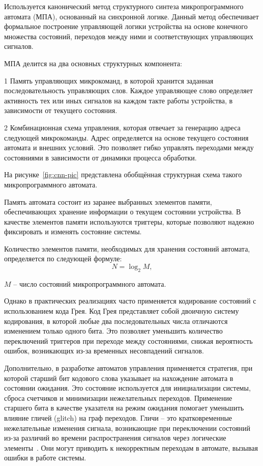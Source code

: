 Используется канонический метод структурного синтеза микропрограммного автомата 
(МПА), основанный на синхронной логике. Данный метод обеспечивает формальное 
построение управляющей логики устройства на основе конечного множества 
состояний, переходов между ними и соответствующих управляющих сигналов.

МПА делится на два основных структурных компонента:

1 Память управляющих микрокоманд, в которой хранится заданная последовательность 
управляющих слов. Каждое управляющее слово определяет активность тех или иных 
сигналов на каждом такте работы устройства, в зависимости от текущего 
состояния.

2 Комбинационная схема управления, которая отвечает за генерацию адреса 
следующей микрокоманды. Адрес определяется на основе текущего состояния 
автомата и внешних условий. Это позволяет гибко управлять переходами между 
состояниями в зависимости от динамики процесса обработки.

На рисунке~\ref{fig:cnn-pic} представлена обобщённая структурная схема 
такого микропрограммного автомата. 


Память автомата состоит из заранее выбранных элементов памяти, обеспечивающих 
хранение информации о текущем состоянии устройства. В качестве элементов памяти 
используются триггеры, которые позволяют надежно фиксировать и изменять 
состояние системы.  

Количество элементов памяти, необходимых для хранения состояний автомата, 
определяется по следующей формуле:
\begin{equation}
    N = \log_{2}{M},
\end{equation}

 $M$ – число состояний микропрограммного автомата.  

Однако в практических реализациях часто применяется кодирование состояний с 
использованием кода Грея. Код Грея представляет собой двоичную систему 
кодирования, в которой любые два последовательных числа отличаются изменением 
только одного бита\cite{Tokheim2003}. Это позволяет уменьшить количество 
переключений триггеров при переходе между состояниями, снижая вероятность 
ошибок, возникающих из-за временных несовпадений сигналов.  

Дополнительно, в разработке автоматов управления применяется стратегия, при 
которой старший бит кодового слова указывает на нахождение автомата в состоянии
ожидания. Это состояние используется для инициализации системы, сброса 
счетчиков и минимизации нежелательных переходов. Применение старшего 
бита в качестве указателя на режим ожидания помогает уменьшить влияние гличей 
(glitch) на граф переходов. Гличи – это кратковременные нежелательные изменения
сигнала, возникающие при переключении состояний из-за различий во времени 
распространения сигналов через логические элементы~\cite{Katz1994}. Они могут 
приводить к некорректным переходам в автомате, вызывая ошибки в работе системы.  


